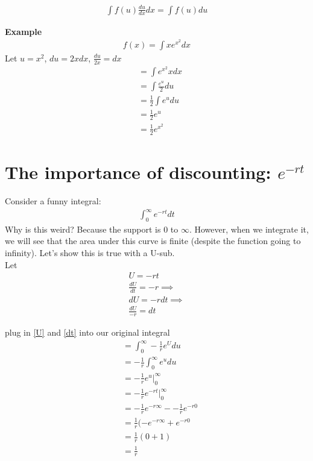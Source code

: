 \documentclass{article}
\begin{document}
\begin{align}
    \int f(u) \frac{du}{dx}dx = \int f(u) du
\end{align}

\textbf{Example}
\begin{align}
    f(x) = \int x e^{x^2} dx
\end{align}
Let $u = x^2$, $du = 2x dx$, $\frac{du}{2x} = dx$
\begin{align}
   &= \int e^{x^2} x dx \\
    &= \int \frac{e^u}{2}du \\
    &= \frac{1}{2} \int e^u du \\
    &= \frac{1}{2} e^u \\
    &= \frac{1}{2} e^{x^2}
\end{align}



\section{The importance of discounting: $e^{-rt}$}


Consider a funny integral: 
\begin{align}
    \int_0^\infty e^{-rt}dt
\end{align}
Why is this weird? Because the support is 0 to $\infty$. However, when we integrate it, we will see that the area under this curve is finite (despite the function going to infinity). Let's show this is true with a U-sub. \\

Let 
\begin{align}
    U = -rt \label{U}\\
    \frac{dU}{dt} = -r \implies \\
    dU = -r dt \implies \\
    \frac{dU}{-r} = dt \label{dt}
\end{align}

plug in \ref{U} and \ref{dt} into our original integral 
\begin{align}
    &= \int_0^\infty - \frac{1}{r} e^U du\\
    &= -\frac{1}{r} \int_0^\infty e^u du\\
    &= -\frac{1}{r} e^u \bigg|_0^\infty \\
    &= -\frac{1}{r} e^{-rt} \bigg|_0^\infty \\
    &=  -\frac{1}{r} e^{-r\infty} - -\frac{1}{r} e^{-r 0} \\
    &= \frac{1}{r} ( -e ^{-r\infty} + e^{-r0} \\
    &= \frac{1}{r} (0 + 1) \\
    &= \frac{1}{r}
\end{align}
\end{document}
